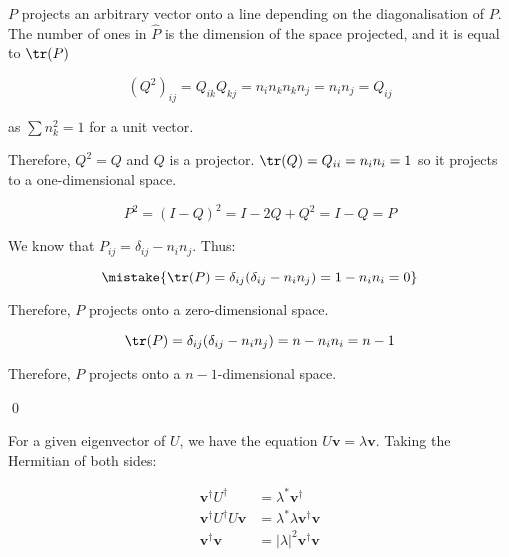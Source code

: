 \documentclass[12pt]{article}
\begin{document}
$P$ projects an arbitrary vector onto a line depending on the diagonalisation of $P$. The number of ones in $\hat{P}$ is the dimension of the space projected, and it is equal to $\tr(P)$


\begin{equation}
    (Q^{2})_{ij} = Q_{ik} Q_{kj} = n_{i}n_{k}n_{k}n_{j} = n_{i}n_{j} = Q_{ij}
\end{equation}

as $\sum n_{k}^{2} = 1$ for a unit vector.

Therefore, $Q^{2} = Q$ and $Q$ is a projector. $\tr(Q) = Q_{ii} = n_{i}n_{i} = 1$ so it projects to a one-dimensional space.


\begin{equation}
    P^{2} = (I - Q)^{2} = I - 2Q + Q^{2} = I - Q = P
\end{equation}

We know that $P_{ij} = \delta_{ij} - n_{i}n_{j}$. Thus:

\begin{equation}
    \mistake{\tr(P) = \delta_{ij}(\delta_{ij} - n_{i}n_{j}) = 1 - n_{i}n_{i} = 0}
\end{equation}

Therefore, $P$ projects onto a zero-dimensional space.

\begin{correction}
    \begin{equation}
        \tr(P) = \delta_{ij}(\delta_{ij} - n_{i}n_{j}) = n - n_{i}n_{i} = n - 1
    \end{equation}

    Therefore, $P$ projects onto a $n-1$-dimensional space.
\end{correction}

\qed



For a given eigenvector of $U$, we have the equation $U \mathbf{v} = \lambda \mathbf{v}$. Taking the Hermitian of both sides:

\begin{equation}
    \begin{split}
        \mathbf{v}^{\dagger} U^{\dagger} &= \lambda^{*} \mathbf{v}^{\dagger} \\
        \mathbf{v}^{\dagger} U^{\dagger} U \mathbf{v} &= \lambda^{*} \lambda \mathbf{v}^{\dagger} \mathbf{v} \\
        \mathbf{v}^{\dagger} \mathbf{v} &= \left\lvert \lambda \right\rvert^{2} \mathbf{v}^{\dagger} \mathbf{v}
    \end{split}
\end{equation}
\end{document}
